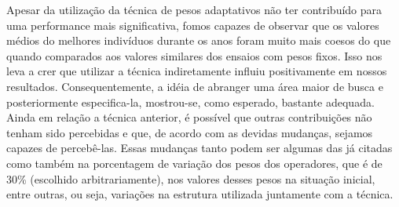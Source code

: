 Apesar da utilização da técnica de pesos adaptativos não ter contribuído para uma performance mais significativa, fomos capazes de observar que os valores médios do melhores indivíduos durante os anos foram muito mais coesos do que quando comparados aos valores similares dos ensaios com pesos fixos. Isso nos leva a crer que utilizar a técnica indiretamente influiu positivamente em nossos resultados. Consequentemente, a idéia de abranger uma área maior de busca e posteriormente especifica-la, mostrou-se, como esperado, bastante adequada.\\

Ainda em relação a técnica anterior, é possível que outras contribuições não tenham sido percebidas e que, de acordo com as devidas mudanças, sejamos capazes de percebê-las. Essas mudanças tanto podem ser algumas das já citadas como também na porcentagem de variação dos pesos dos operadores, que é de 30\% (escolhido arbitrariamente), nos valores desses pesos na situação inicial, entre outras, ou seja, variações na estrutura utilizada juntamente com a técnica.\\


